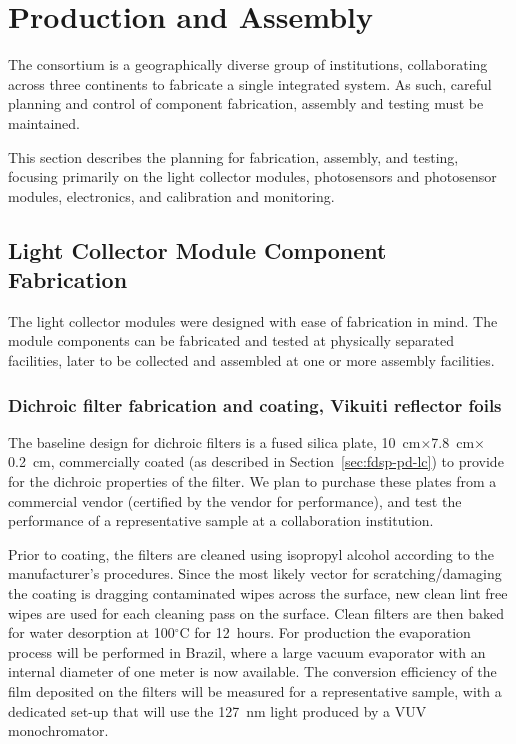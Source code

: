 \section{Production and Assembly}
\label{sec:fdsp-pd-prod-assy}
The \single {} consortium is a geographically diverse group of institutions, collaborating across three continents to fabricate a single integrated system.  As such, careful planning and control of component fabrication, assembly and testing must be maintained.

This section describes the planning for fabrication, assembly, and testing, focusing primarily on the  light collector modules, photosensors and photosensor modules, electronics, and calibration and monitoring.
 
\subsection{Light Collector Module Component Fabrication}

The  light collector modules were designed with ease of fabrication in mind.  The module components can be fabricated and  tested at physically separated facilities, later to be collected and assembled at one or more assembly facilities.  %

\subsubsection{Dichroic filter fabrication and coating, Vikuiti reflector foils}

The baseline design for dichroic filters is 
a fused silica plate,  \SI{10}{cm}$\times$\SI{7.8}{cm}$\times$\SI{0.2}{cm}, commercially coated (as described in Section~\ref{sec:fdsp-pd-lc}) to provide for the dichroic properties of the filter.  
We plan to purchase these plates from a commercial vendor (certified by the vendor for performance), and test the performance of a representative sample at a collaboration institution.  

Prior to coating, the filters are cleaned using isopropyl alcohol according to the manufacturer's procedures. %
Since the most likely vector for scratching/damaging the coating is dragging contaminated wipes across the surface, new clean lint free wipes are used for each cleaning pass on the surface. Clean filters are then baked for water desorption at 100$^\circ$C for \SI{12}{hours}. 
For   production the evaporation process will be performed
in Brazil, 
where a large vacuum evaporator with an internal diameter of one meter is now available. The conversion efficiency of the film deposited on the filters will be measured for a representative sample, with a dedicated set-up that will use the \SI{127}{nm} light produced by a VUV monochromator.

